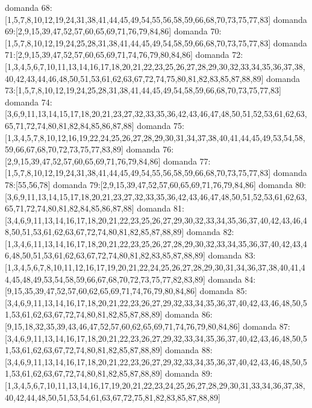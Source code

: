 domanda 68:[1,5,7,8,10,12,19,24,31,38,41,44,45,49,54,55,56,58,59,66,68,70,73,75,77,83]
domanda 69:[2,9,15,39,47,52,57,60,65,69,71,76,79,84,86]
domanda 70:[1,5,7,8,10,12,19,24,25,28,31,38,41,44,45,49,54,58,59,66,68,70,73,75,77,83]
domanda 71:[2,9,15,39,47,52,57,60,65,69,71,74,76,79,80,84,86]
domanda 72:[1,3,4,5,6,7,10,11,13,14,16,17,18,20,21,22,23,25,26,27,28,29,30,32,33,34,35,36,37,38,40,42,43,44,46,48,50,51,53,61,62,63,67,72,74,75,80,81,82,83,85,87,88,89]
domanda 73:[1,5,7,8,10,12,19,24,25,28,31,38,41,44,45,49,54,58,59,66,68,70,73,75,77,83]
domanda 74:[3,6,9,11,13,14,15,17,18,20,21,23,27,32,33,35,36,42,43,46,47,48,50,51,52,53,61,62,63,65,71,72,74,80,81,82,84,85,86,87,88]
domanda 75:[1,3,4,5,7,8,10,12,16,19,22,24,25,26,27,28,29,30,31,34,37,38,40,41,44,45,49,53,54,58,59,66,67,68,70,72,73,75,77,83,89]
domanda 76:[2,9,15,39,47,52,57,60,65,69,71,76,79,84,86]
domanda 77:[1,5,7,8,10,12,19,24,31,38,41,44,45,49,54,55,56,58,59,66,68,70,73,75,77,83]
domanda 78:[55,56,78]
domanda 79:[2,9,15,39,47,52,57,60,65,69,71,76,79,84,86]
domanda 80:[3,6,9,11,13,14,15,17,18,20,21,23,27,32,33,35,36,42,43,46,47,48,50,51,52,53,61,62,63,65,71,72,74,80,81,82,84,85,86,87,88]
domanda 81:[3,4,6,9,11,13,14,16,17,18,20,21,22,23,25,26,27,29,30,32,33,34,35,36,37,40,42,43,46,48,50,51,53,61,62,63,67,72,74,80,81,82,85,87,88,89]
domanda 82:[1,3,4,6,11,13,14,16,17,18,20,21,22,23,25,26,27,28,29,30,32,33,34,35,36,37,40,42,43,46,48,50,51,53,61,62,63,67,72,74,80,81,82,83,85,87,88,89]
domanda 83:[1,3,4,5,6,7,8,10,11,12,16,17,19,20,21,22,24,25,26,27,28,29,30,31,34,36,37,38,40,41,44,45,48,49,53,54,58,59,66,67,68,70,72,73,75,77,82,83,89]
domanda 84:[9,15,35,39,47,52,57,60,62,65,69,71,74,76,79,80,84,86]
domanda 85:[3,4,6,9,11,13,14,16,17,18,20,21,22,23,26,27,29,32,33,34,35,36,37,40,42,43,46,48,50,51,53,61,62,63,67,72,74,80,81,82,85,87,88,89]
domanda 86:[9,15,18,32,35,39,43,46,47,52,57,60,62,65,69,71,74,76,79,80,84,86]
domanda 87:[3,4,6,9,11,13,14,16,17,18,20,21,22,23,26,27,29,32,33,34,35,36,37,40,42,43,46,48,50,51,53,61,62,63,67,72,74,80,81,82,85,87,88,89]
domanda 88:[3,4,6,9,11,13,14,16,17,18,20,21,22,23,26,27,29,32,33,34,35,36,37,40,42,43,46,48,50,51,53,61,62,63,67,72,74,80,81,82,85,87,88,89]
domanda 89:[1,3,4,5,6,7,10,11,13,14,16,17,19,20,21,22,23,24,25,26,27,28,29,30,31,33,34,36,37,38,40,42,44,48,50,51,53,54,61,63,67,72,75,81,82,83,85,87,88,89]


